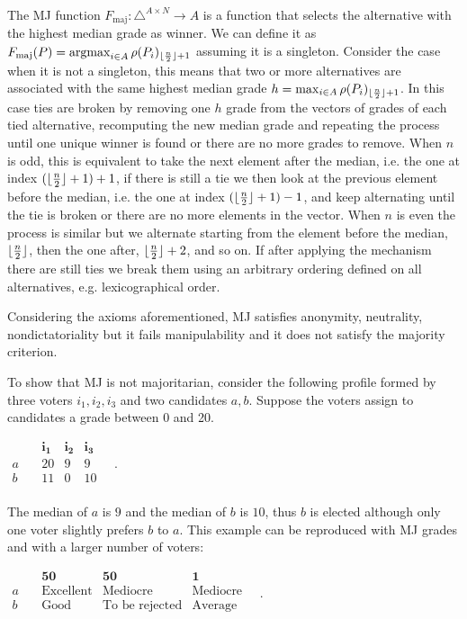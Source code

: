 	The \ac{MJ} function $F_\text{maj}:\triangle^{A \times N} \rightarrow A$	is a function that selects the alternative with the highest median grade as winner. We can define it as $F_\text{maj}(P) = \operatorname*{argmax}_{i\in A}\rho(P_i)_{\lfloor\frac{n}{2}\rfloor+ 1}$ assuming it is a singleton. Consider the case when it is not a singleton, this means that two or more alternatives are associated with the same highest median grade $h=\max_{i\in A}\rho(P_i)_{\lfloor\frac{n}{2}\rfloor + 1}$. In this case ties are broken by removing one $h$ grade from the vectors of grades of each tied alternative, recomputing the new median grade and repeating the process until one unique winner is found or there are no more grades to remove. When $n$ is odd, this is equivalent to take the next element after the median, i.e. the one at index $(\lfloor\frac{n}{2}\rfloor + 1) +1$, if there is still a tie we then look at the previous element before the median, i.e. the one at index $(\lfloor\frac{n}{2}\rfloor + 1) -1$, and keep alternating until the tie is broken or there are no more elements in the vector. When $n$ is even the process is similar but we alternate starting from the element before the median, $\lfloor\frac{n}{2}\rfloor$, then the one after, $\lfloor\frac{n}{2}\rfloor + 2$, and so on. If after applying the mechanism there are still ties we break them using an arbitrary ordering defined on all alternatives, e.g. lexicographical order.
	
	Considering the axioms aforementioned, \ac{MJ} satisfies anonymity, neutrality, nondictatoriality but it fails manipulability and it does not satisfy the majority criterion.
	\begin{example}
		\label{ex:MJfailsMajority}
		To show that \ac{MJ} is not majoritarian, consider the following profile formed by three voters $i_1, i_2, i_3$ and two candidates $a, b$. Suppose the voters assign to candidates a grade between 0 and 20.
		\begin{center}
			$
			\begin{array}{cccc}
				&\mathbf{i_1} & \mathbf{i_2} & \mathbf{i_3} \\
				a \quad &20&9&9\\
				b \quad &11&0&10\\
			\end{array}\quad .
			$
		\end{center}
		The median of $a$ is $9$ and the median of $b$ is $10$, thus $b$ is elected although only one voter slightly prefers $b$ to $a$. This example can be reproduced with \ac{MJ} grades and with a larger number of voters:
		\begin{center}
			$
			\begin{array}{cccc}
				&\mathbf{50} & \mathbf{50} & \mathbf{1} \\
				a \quad &\text{Excellent}&\text{Mediocre}&\text{Mediocre}\\
				b \quad &\text{Good}&\text{To be rejected}&\text{Average}\\
			\end{array}\quad .
			$
		\end{center}
	\end{example}

